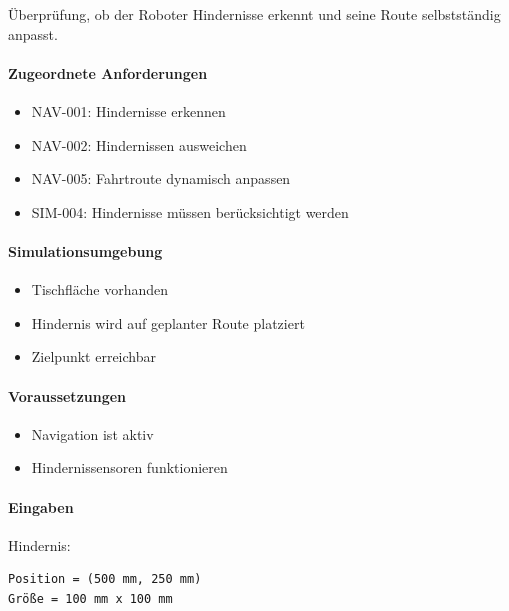 Überprüfung, ob der Roboter Hindernisse erkennt und seine Route
selbstständig anpasst.

\paragraph{Zugeordnete
Anforderungen}\label{zugeordnete-anforderungen-17}

\begin{itemize}
\tightlist
\item
  NAV-001: Hindernisse erkennen
\item
  NAV-002: Hindernissen ausweichen
\item
  NAV-005: Fahrtroute dynamisch anpassen
\item
  SIM-004: Hindernisse müssen berücksichtigt werden
\end{itemize}

\paragraph{Simulationsumgebung}\label{simulationsumgebung-2}

\begin{itemize}
\tightlist
\item
  Tischfläche vorhanden
\item
  Hindernis wird auf geplanter Route platziert
\item
  Zielpunkt erreichbar
\end{itemize}

\paragraph{Voraussetzungen}\label{voraussetzungen-17}

\begin{itemize}
\tightlist
\item
  Navigation ist aktiv
\item
  Hindernissensoren funktionieren
\end{itemize}

\paragraph{Eingaben}\label{eingaben-16}

Hindernis:

\begin{verbatim}
Position = (500 mm, 250 mm)
Größe = 100 mm x 100 mm
\end{verbatim}

